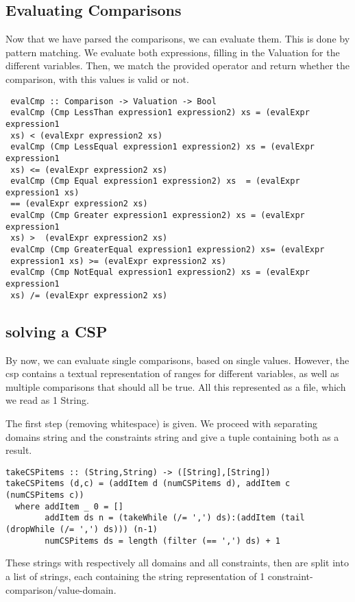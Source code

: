 \documentclass[a4paper,11pt]{article}
\begin{document}
 \subsection{Evaluating Comparisons}
 
 Now that we have parsed the comparisons, we can evaluate them. This is done 
 by pattern matching. We evaluate both expressions, filling in the Valuation 
 for the different variables. Then, we match the provided operator and 
 return whether the comparison, with this values is valid or not.
 \begin{lstlisting}
 evalCmp :: Comparison -> Valuation -> Bool
 evalCmp (Cmp LessThan expression1 expression2) xs = (evalExpr expression1 
 xs) < (evalExpr expression2 xs)
 evalCmp (Cmp LessEqual expression1 expression2) xs = (evalExpr expression1 
 xs) <= (evalExpr expression2 xs)
 evalCmp (Cmp Equal expression1 expression2) xs  = (evalExpr expression1 xs) 
 == (evalExpr expression2 xs)
 evalCmp (Cmp Greater expression1 expression2) xs = (evalExpr expression1 
 xs) >  (evalExpr expression2 xs)
 evalCmp (Cmp GreaterEqual expression1 expression2) xs= (evalExpr 
 expression1 xs) >= (evalExpr expression2 xs)
 evalCmp (Cmp NotEqual expression1 expression2) xs = (evalExpr expression1 
 xs) /= (evalExpr expression2 xs)
 \end{lstlisting}
 \subsection{solving a CSP}
 
 By now, we can evaluate single comparisons, based on single values. 
 However, the csp contains a textual representation of ranges for different 
 variables, as well as multiple comparisons that should all be true. All this 
 represented as a file, which we read as 1 String.
 
 The first step (removing whitespace) is given. We proceed with separating 
 domains string and the constraints  string and give a tuple containing  both 
 as a result.
 
\begin{lstlisting}
takeCSPitems :: (String,String) -> ([String],[String])
takeCSPitems (d,c) = (addItem d (numCSPitems d), addItem c (numCSPitems c))
  where addItem _ 0 = []
        addItem ds n = (takeWhile (/= ',') ds):(addItem (tail (dropWhile (/= ',') ds))) (n-1)
        numCSPitems ds = length (filter (== ',') ds) + 1
\end{lstlisting}
 
 These strings with respectively all domains and all constraints, then are split into a list of strings, each containing the string representation of 1 constraint-comparison/value-domain.
 
\end{document}
